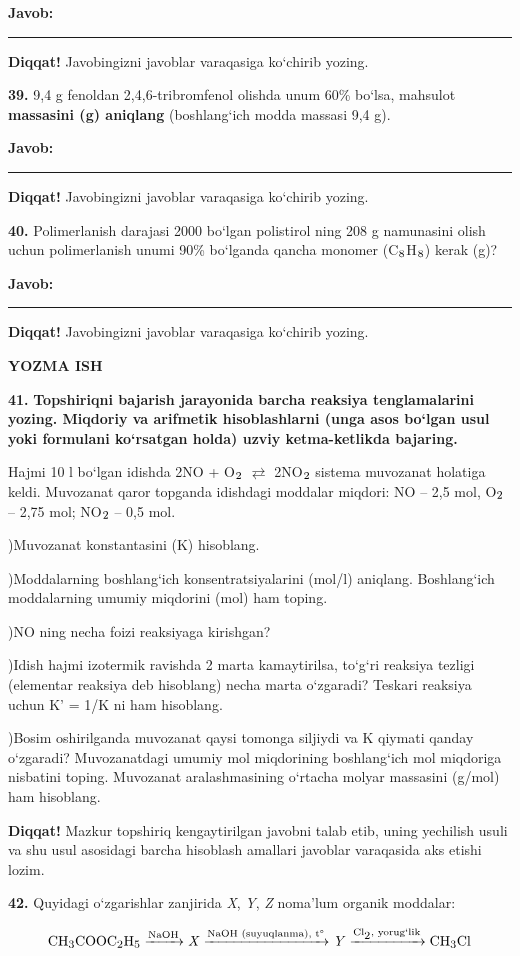 \documentclass[11pt,a4paper]{article}
\renewcommand{\textsubscript}[1]{\ensuremath{_{\text{\fontsize{8}{8}\selectfont #1}}}}
\newcommand{\diqqat}[1]{\par\smallskip\noindent\textbf{Diqqat!} #1\par\medskip}
\newcommand{\javob}{\par\smallskip\noindent\textbf{Javob:} \rule[-2pt]{7.5cm}{0.4pt}\par\smallskip\noindent\textbf{Diqqat!} Javobingizni javoblar varaqasiga ko`chirib yozing.\par\medskip}
\begin{document}
\javob
\noindent\textbf{39.} 9,4 g fenoldan 2,4,6-tribromfenol olishda unum 60\% bo`lsa, mahsulot \textbf{massasini (g) aniqlang} (boshlang`ich modda massasi 9,4 g).
\javob
\noindent\textbf{40.} Polimerlanish darajasi 2000 bo`lgan polistirol ning 208 g namunasini olish uchun polimerlanish unumi 90\% bo`lganda qancha monomer (C\textsubscript{8}H\textsubscript{8}) kerak (g)?
\javob
\par\bigskip\begin{center}\textbf{\fontsize{13}{15}\selectfont YOZMA ISH}\end{center}
\noindent\textbf{41.} \textbf{Topshiriqni bajarish jarayonida barcha reaksiya tenglamalarini yozing. Miqdoriy va arifmetik hisoblashlarni (unga asos bo`lgan usul yoki formulani ko`rsatgan holda) uzviy ketma-ketlikda bajaring.}\par\smallskip
Hajmi 10 l bo`lgan idishda 2NO + O\textsubscript{2} $\rightleftarrows$ 2NO\textsubscript{2} sistema muvozanat holatiga keldi. Muvozanat qaror topganda idishdagi moddalar miqdori: NO -- 2,5 mol, O\textsubscript{2} -- 2,75 mol; NO\textsubscript{2} -- 0,5 mol.\par
{})Muvozanat konstantasini (K) hisoblang.\par
{})Moddalarning boshlang`ich konsentratsiyalarini (mol/l) aniqlang. Boshlang`ich moddalarning umumiy miqdorini (mol) ham toping.\par
{})NO ning necha foizi reaksiyaga kirishgan?\par
{})Idish hajmi izotermik ravishda 2 marta kamaytirilsa, to`g`ri reaksiya tezligi (elementar reaksiya deb hisoblang) necha marta o`zgaradi? Teskari reaksiya uchun K' = 1/K ni ham hisoblang.\par
{})Bosim oshirilganda muvozanat qaysi tomonga siljiydi va K qiymati qanday o`zgaradi? Muvozanatdagi umumiy mol miqdorining boshlang`ich mol miqdoriga nisbatini toping. Muvozanat aralashmasining o`rtacha molyar massasini (g/mol) ham hisoblang.\par
\diqqat{Mazkur topshiriq kengaytirilgan javobni talab etib, uning yechilish usuli va shu usul asosidagi barcha hisoblash amallari javoblar varaqasida aks etishi lozim.}
\noindent\textbf{42.} Quyidagi o`zgarishlar zanjirida \textit{X}, \textit{Y}, \textit{Z} noma'lum organik moddalar:\par
\[\setlength{\fboxsep}{0pt}\text{CH\textsubscript{3}COOC\textsubscript{2}H\textsubscript{5}}\xrightarrow{\text{NaOH}}\text{\textit{X}}\xrightarrow{\text{NaOH (suyuqlanma), t\textdegree{}}}\text{\textit{Y}}\xrightarrow{\text{Cl\textsubscript{2}, yorug`lik}}\text{CH\textsubscript{3}Cl}\]
\end{document}

